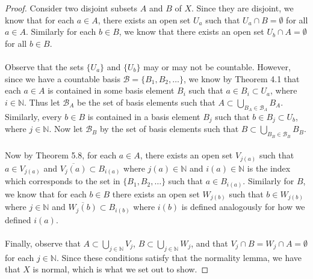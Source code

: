 \documentclass[a4paper,12pt,twoside]{hmcpset}
\begin{document}
\begin{proof}
    Consider two disjoint subsets $A$ and $B$ of $X$. Since they are
    disjoint, we know that for each $a \in A$, there exists an open
    set $U_a$ such that $U_a \cap B = \emptyset$ for all $a \in A$.
    Similarly for each $b \in B$, we know that there exists an open
    set $U_b \cap A = \emptyset$ for all $b \in B$. \\
    \\
    Observe that the sets $\{U_a\}$ and $\{U_b\}$ may or may not be
    countable. However, since we have a countable basis $\mathscr{B} =
    \{B_1, B_2, \dots\}$, we know by Theorem 4.1 that each $a \in A$
    is contained in some basis element $B_i$ such that $a \in B_i
    \subset U_a$, where $i \in \mathbb{N}$. Thus let $\mathscr{B}_A$
    be the set of basis elements such that $A \subset \bigcup_{B_A \in
    \mathscr{B}_A} B_A$. Similarly, every $b \in B$ is contained in a
    basis element $B_j$ such that $b \in B_j \subset U_b$, where $j
    \in \mathbb{N}$. Now let $\mathscr{B}_B$ by the set of basis
    elements such that $B \subset \bigcup_{B_B \in \mathscr{B}_B}
    B_B$. \\
    \\
    Now by Theorem 5.8, for each $a \in A$, there exists an open set
    $V_{j(a)}$ such that $a \in V_{j(a)}$ and $\overline{V_j(a)} \subset B_{i(a)}$
    where $j(a) \in \mathbb{N}$ and $i(a) \in \mathbb{N}$ is the index
    which corresponds to the set in $\{B_1, B_2, \dots\}$ such that $a
    \in B_{i(a)}$. Similarly for $B$, we know that for each $b \in B$
    there exists an open set $W_{j(b)}$ such that $b \in W_{j(b)}$ where $j \in
    \mathbb{N}$ and $\overline{W_j(b)} \subset B_{i(b)}$ where $i(b)$ is
    defined analogously for how we defined $i(a)$. \\
    \\
    Finally, observe that $A \subset \bigcup_{j \in \mathbb{N}} V_j$,
    $B \subset \bigcup_{j \in \mathbb{N}} W_j$, and that $V_j \cap B =
    W_j \cap A=\emptyset$ for each $j \in \mathbb{N}$. Since these
    conditions satisfy that the normality lemma, we have that $X$ is
    normal, which is what we set out to show.
\end{proof}
\end{document}
